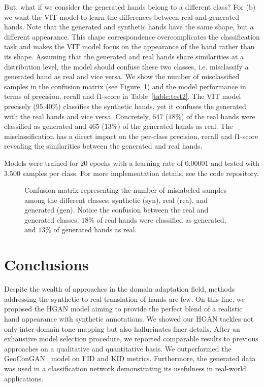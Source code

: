 But, what if we consider the generated hands belong to a different class? For (b) we want the \ac{VIT} model to learn the differences between real and generated hands. Note that the generated and synthetic hands have the same shape, but a different appearance. This shape correspondence overcomplicates the classification task and makes the \ac{VIT} model focus on the appearance of the hand rather than its shape. Assuming that the generated and real hands share similarities at a distribution level, the model should confuse these two classes, i.e. misclassify a generated hand as real and vice versa. We show the number of misclassified samples in the confusion matrix (see Figure~\ref{fig:confusion}) and the model performance in terms of precision, recall and f$1$-score in Table~\ref{table:test2}. The \ac{VIT} model precisely ($95.40\%$) classifies the synthetic hands, yet it confuses the generated with the real hands and vice versa. Concretely, $647$ ($18\%$) of the real hands were classified as generated and $465$ ($13\%$) of the generated hands as real. The misclassification has a direct impact on the per-class precision, recall and f$1$-score revealing the similarities between the generated and real hands.

Models were trained for $20$ epochs with a learning rate of $0.00001$ and tested with $3.500$ samples per class. For more implementation details, see the code repository.

\begin{figure}[!t]
	\centering
	\resizebox{.6\textwidth}{!}{}
	\caption{Confusion matrix representing the number of mislabeled samples among the different classes: synthetic (syn), real (rea), and generated (gen). Notice the confusion between the real and generated classes. $18\%$ of real hands were classified as generated, and $13\%$ of generated hands as real.}
	\label{fig:confusion}
\end{figure}

\section{Conclusions}
Despite the wealth of approaches in the domain adaptation field, methods addressing the synthetic-to-real translation of hands are few. On this line, we proposed the \ac{HGAN} model aiming to provide the perfect blend of a realistic hand appearance with synthetic annotations. We showed our \ac{HGAN} tackles not only inter-domain tone mapping but also hallucinates finer details. After an exhaustive model selection procedure, we reported comparable results to previous approaches on a qualitative and quantitative basis. We outperformed the \ac{GeoConGAN}~\cite{Mueller2018} model on \ac{FID} and \ac{KID} metrics. Furthermore, the generated data was used in a classification network demonstrating its usefulness in real-world applications.
